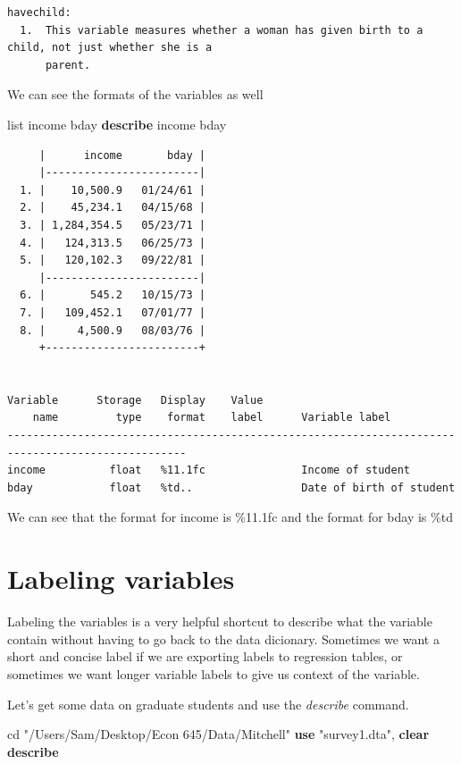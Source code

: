 \documentclass[
]{book}
\newenvironment{Shaded}{\begin{snugshade}}{\end{snugshade}}
\newcommand{\KeywordTok}[1]{\textcolor[rgb]{0.13,0.29,0.53}{\textbf{#1}}}
\newcommand{\NormalTok}[1]{#1}
\newcommand{\OtherTok}[1]{\textcolor[rgb]{0.56,0.35,0.01}{#1}}
\newcommand{\StringTok}[1]{\textcolor[rgb]{0.31,0.60,0.02}{#1}}
\begin{document}
\begin{verbatim}
havechild:
  1.  This variable measures whether a woman has given birth to a child, not just whether she is a
      parent.
\end{verbatim}

We can see the formats of the variables as well

\begin{Shaded}
\begin{Highlighting}[]
\OtherTok{list}\NormalTok{ income bday}
\KeywordTok{describe}\NormalTok{ income bday}
\end{Highlighting}
\end{Shaded}

\begin{verbatim}
     |      income       bday |
     |------------------------|
  1. |    10,500.9   01/24/61 |
  2. |    45,234.1   04/15/68 |
  3. | 1,284,354.5   05/23/71 |
  4. |   124,313.5   06/25/73 |
  5. |   120,102.3   09/22/81 |
     |------------------------|
  6. |       545.2   10/15/73 |
  7. |   109,452.1   07/01/77 |
  8. |     4,500.9   08/03/76 |
     +------------------------+


Variable      Storage   Display    Value
    name         type    format    label      Variable label
--------------------------------------------------------------------------------------------------
income          float   %11.1fc               Income of student
bday            float   %td..                 Date of birth of student
\end{verbatim}

We can see that the format for income is \%11.1fc and the format for bday is \%td

\section{Labeling variables}\label{labeling-variables}

Labeling the variables is a very helpful shortcut to describe what the variable contain without having to go back to the data dicionary. Sometimes we want a short and concise label if we are exporting labels to regression tables, or sometimes we want longer variable labels to give us context of the variable.

Let's get some data on graduate students and use the \emph{describe} command.

\begin{Shaded}
\begin{Highlighting}[]
\NormalTok{cd }\StringTok{"/Users/Sam/Desktop/Econ 645/Data/Mitchell"}
\KeywordTok{use} \StringTok{"survey1.dta"}\NormalTok{, }\KeywordTok{clear}
\KeywordTok{describe} 
\end{Highlighting}
\end{Shaded}
\end{document}
